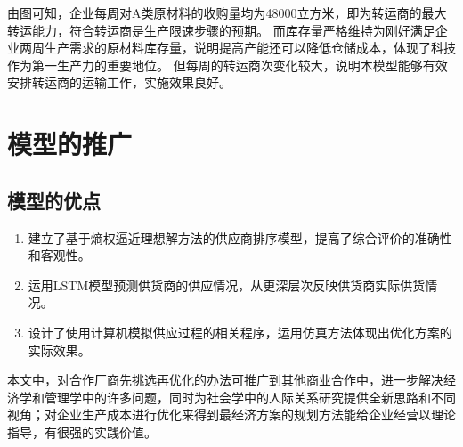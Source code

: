 由图可知，企业每周对A类原材料的收购量均为48000立方米，即为转运商的最大转运能力，符合转运商是生产限速步骤的预期。
而库存量严格维持为刚好满足企业两周生产需求的原材料库存量，说明提高产能还可以降低仓储成本，体现了科技作为第一生产力的重要地位。
但每周的转运商次变化较大，说明本模型能够有效安排转运商的运输工作，实施效果良好。

\section{模型的推广}

\subsection{模型的优点}
\begin{enumerate}
\item 建立了基于熵权逼近理想解方法的供应商排序模型，提高了综合评价的准确性和客观性。
\item 运用LSTM模型预测供货商的供应情况，从更深层次反映供货商实际供货情况。
\item 设计了使用计算机模拟供应过程的相关程序，运用仿真方法体现出优化方案的实际效果。
\end{enumerate}

本文中，对合作厂商先挑选再优化的办法可推广到其他商业合作中，进一步解决经济学和管理学中的许多问题，同时为社会学中的人际关系研究提供全新思路和不同视角；对企业生产成本进行优化来得到最经济方案的规划方法能给企业经营以理论指导，有很强的实践价值。
